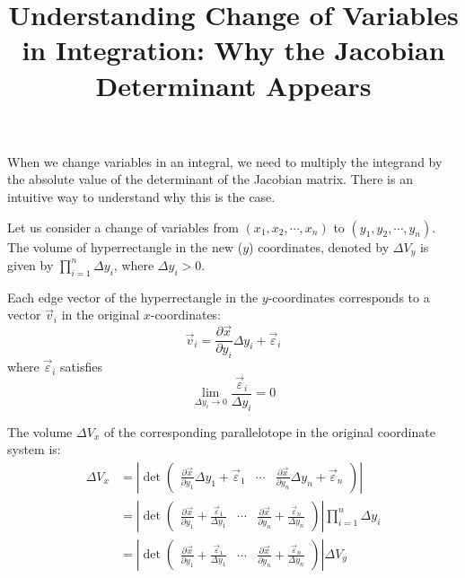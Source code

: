 \documentclass[letterpaper, 12pt]{article}
\title{Understanding Change of Variables in Integration: Why the Jacobian Determinant Appears}
\date{}
\theoremstyle{custom}
\begin{document}
\maketitle

When we change variables in an integral, we need to multiply the integrand by the absolute value of the determinant of the Jacobian matrix.
There is an intuitive way to understand why this is the case.

Let us consider a change of variables from $(x_1, x_2, \cdots , x_n)$ to $(y_1, y_2, \cdots , y_n)$.
The volume of hyperrectangle in the new ($y$) coordinates, denoted by $\Delta V_y$ is given by $\displaystyle \prod_{i=1}^n \Delta y_i$, where $\Delta y_i > 0$.

Each edge vector of the hyperrectangle in the $y$-coordinates corresponds to a vector $\vec{v}_i$ in the original $x$-coordinates:
\begin{equation*}
  \vec{v}_i = \frac{\partial \vec{x}}{\partial y_i} \Delta y_i + \vec{\varepsilon}_i
\end{equation*}
where $\vec{\varepsilon}_i$ satisfies
\begin{equation*}  
  \lim_{\Delta y_i \rightarrow 0} \frac{\vec{\varepsilon}_i}{\Delta y_i} = 0
\end{equation*}

The volume $\Delta V_x$ of the corresponding parallelotope in the original coordinate system is:
\begin{align*}
  \Delta V_x &= \left| \det
  \begin{pmatrix}
    \displaystyle \frac{\partial \vec{x}}{\partial y_1} \Delta y_1 + \vec{\varepsilon}_1 & \cdots & \displaystyle \frac{\partial \vec{x}}{\partial y_n} \Delta y_n + \vec{\varepsilon}_n
  \end{pmatrix}\right| \\
  &=\left| \det 
  \begin{pmatrix}
    \displaystyle \frac{\partial \vec{x}}{\partial y_1} + \frac{\vec{\varepsilon}_1}{\Delta y_1} & \cdots & \displaystyle \frac{\partial \vec{x}}{\partial y_n} + \frac{\vec{\varepsilon}_n}{\Delta y_n} 
  \end{pmatrix}\right|
  \prod_{i=1}^n \Delta y_i \\
  &= \left| \det \begin{pmatrix}
    \displaystyle \frac{\partial \vec{x}}{\partial y_1} + \frac{\vec{\varepsilon}_1}{\Delta y_1} & \cdots & \displaystyle \frac{\partial \vec{x}}{\partial y_n} + \frac{\vec{\varepsilon}_n}{\Delta y_n} 
  \end{pmatrix}\right| \Delta V_y
\end{align*}
\end{document}
